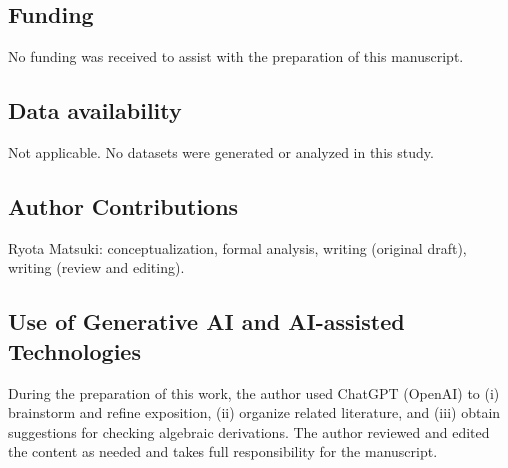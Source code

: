 \documentclass[sn-mathphys-ay]{sn-jnl} %
\theoremstyle{remark}
\begin{document}
\subsection*{Funding}
No funding was received to assist with the preparation of this manuscript.

\subsection*{Data availability}
Not applicable. No datasets were generated or analyzed in this study.

\subsection*{Author Contributions}
Ryota Matsuki: conceptualization, formal analysis, writing (original draft), writing (review and editing).

\subsection*{Use of Generative AI and AI-assisted Technologies}
During the preparation of this work, the author used ChatGPT (OpenAI) to (i) brainstorm and refine exposition, (ii) organize related literature, and (iii) obtain suggestions for checking algebraic derivations. The author reviewed and edited the content as needed and takes full responsibility for the manuscript.
\end{document}
